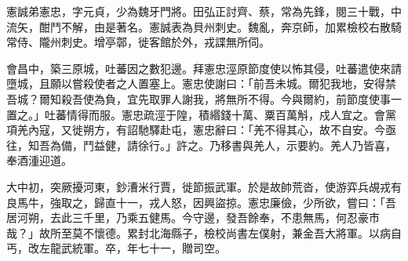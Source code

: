 \begin{pinyinscope}
 憲誠弟憲忠，字元貞，少為魏牙門將。田弘正討齊、蔡，常為先鋒，閱三十戰，中流矢，酣鬥不解，由是著名。憲誠表為貝州刺史。魏亂，奔京師，加累檢校右散騎常侍、隴州刺史。增亭鄣，徙客館於外，戎諜無所伺。



 會昌中，築三原城，吐蕃因之數犯邊。拜憲忠涇原節度使以怖其侵，吐蕃遣使來請墮城，且願以嘗殺使者之人置塞上。憲忠使謝曰：「前吾未城。爾犯我地，安得禁吾城？爾知殺吾使為負，宜先取罪人謝我，將無所不得。今與爾約，前節度使事一置之。」吐蕃情得而服。憲忠疏涇于隍，積緡錢十萬、粟百萬斛，戍人宜之。會黨項羌內寇，又徙朔方，有詔馳驛赴屯，憲忠辭曰：「羌不得其心，故不自安。今亟往，知吾為備，鬥益健，請徐行。」許之。乃移書與羌人，示要約。羌人乃皆喜，奉酒湩迎道。



 大中初，突厥擾河東，鈔漕米行賈，徙節振武軍。於是故帥荒沓，使游弈兵覘戎有良馬牛，強取之，歸直十一，戎人怒，因興盜掠。憲忠廉儉，少所欲，嘗曰：「吾居河朔，去此三千里，乃乘五健馬。今守邊，發吾餘奉，不患無馬，何忍豪市哉？」故所至莫不懷德。累封北海縣子，檢校尚書左僕射，兼金吾大將軍。以病自丐，改左龍武統軍。卒，年七十一，贈司空。



\end{pinyinscope}